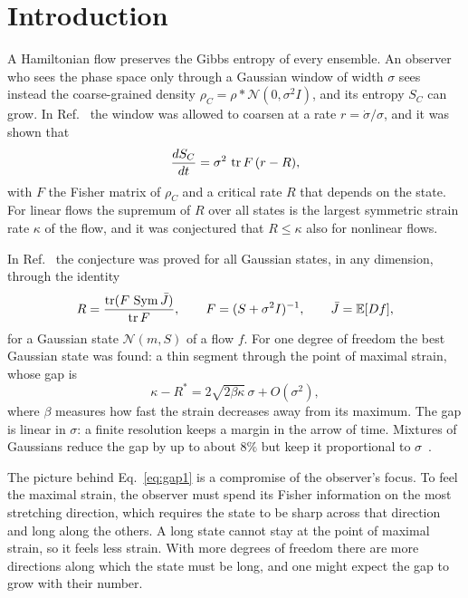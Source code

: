 \section{Introduction}
\label{sec:intro}

A Hamiltonian flow preserves the Gibbs entropy of every ensemble. An observer who sees the phase space only through a Gaussian window of width $\sigma$ sees instead the coarse-grained density $\rho_C = \rho * \mathcal N(0,\sigma^2 I)$, and its entropy $S_C$ can grow. In Ref.~\cite{namba2026arrow} the window was allowed to coarsen at a rate $r = \dot\sigma/\sigma$, and it was shown that
\begin{equation}
\frac{dS_C}{dt} = \sigma^2\,\operatorname{tr} F\,(r - R),
\label{eq:SC}
\end{equation}
with $F$ the Fisher matrix of $\rho_C$ and a critical rate $R$ that depends on the state. For linear flows the supremum of $R$ over all states is the largest symmetric strain rate $\kappa$ of the flow, and it was conjectured that $R \leq \kappa$ also for nonlinear flows.

In Ref.~\cite{namba2026gap} the conjecture was proved for all Gaussian states, in any dimension, through the identity
\begin{equation}
R = \frac{\operatorname{tr}(F\,\operatorname{Sym}\bar J)}{\operatorname{tr} F}, \qquad F = (S + \sigma^2 I)^{-1}, \qquad \bar J = \mathbb{E}[Df],
\label{eq:law}
\end{equation}
for a Gaussian state $\mathcal N(m,S)$ of a flow $f$. For one degree of freedom the best Gaussian state was found: a thin segment through the point of maximal strain, whose gap is
\begin{equation}
\kappa - R^* = 2\sqrt{2\beta\kappa}\,\sigma + O(\sigma^2),
\label{eq:gap1}
\end{equation}
where $\beta$ measures how fast the strain decreases away from its maximum. The gap is linear in $\sigma$: a finite resolution keeps a margin in the arrow of time. Mixtures of Gaussians reduce the gap by up to about $8\%$ but keep it proportional to $\sigma$~\cite{namba2026gap}.

The picture behind Eq.~\eqref{eq:gap1} is a compromise of the observer's focus. To feel the maximal strain, the observer must spend its Fisher information on the most stretching direction, which requires the state to be sharp across that direction and long along the others. A long state cannot stay at the point of maximal strain, so it feels less strain. With more degrees of freedom there are more directions along which the state must be long, and one might expect the gap to grow with their number.

